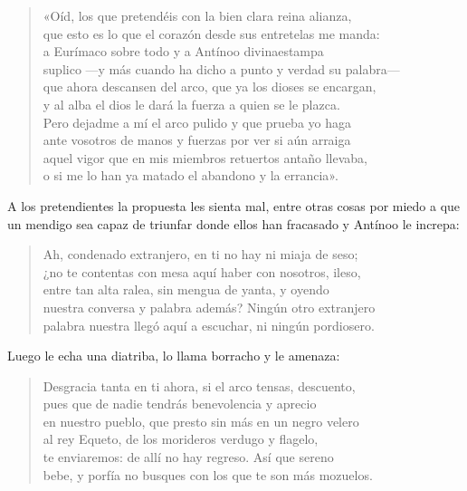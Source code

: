 \begin{verse}
«Oíd, los que pretendéis con la bien clara reina alianza,\\
que esto es lo que el corazón desde sus entretelas me manda:\\
a Eurímaco sobre todo y a Antínoo divinaestampa\\
suplico ---y más cuando ha dicho a punto y verdad su palabra---\\
que ahora descansen del arco, que ya los dioses se encargan,\\
y al alba el dios le dará la fuerza a quien se le plazca.\\
Pero dejadme a mí el arco pulido y que prueba yo haga\\
ante vosotros de manos y fuerzas por ver si aún arraiga\\
aquel vigor que en mis miembros retuertos antaño llevaba,\\
o si me lo han ya matado el abandono y la errancia».
\end{verse}

A los pretendientes la propuesta les sienta mal, entre otras cosas por miedo a que un mendigo sea capaz de triunfar donde ellos han fracasado y Antínoo le increpa:

\begin{verse}
Ah, condenado extranjero, en ti no hay ni miaja de seso;\\
¿no te contentas con mesa aquí haber con nosotros, ileso,\\
entre tan alta ralea, sin mengua de yanta, y oyendo\\
nuestra conversa y palabra además? Ningún otro extranjero\\
palabra nuestra llegó aquí a escuchar, ni ningún pordiosero.
\end{verse}

Luego le echa una diatriba, lo llama borracho y le amenaza:

\begin{verse}
Desgracia tanta en ti ahora, si el arco tensas, descuento,\\
pues que de nadie tendrás benevolencia y aprecio\\
en nuestro pueblo, que presto sin más en un negro velero\\
al rey Equeto, de los morideros verdugo y flagelo,\\
te enviaremos: de allí no hay regreso. Así que sereno\\
bebe, y porfía no busques con los que te son más mozuelos.
\end{verse}

